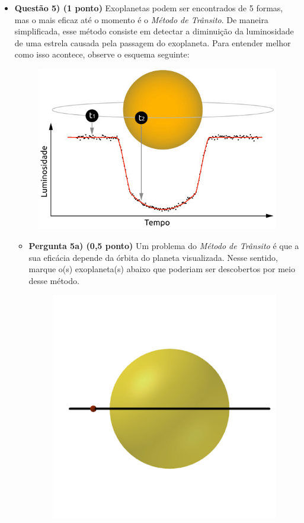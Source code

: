 \documentclass[a4paper, 12pt]{article}
\begin{document}
\begin{flushleft}
\begin{itemize}
		\item \textbf{Questão 5) (1 ponto)} Exoplanetas podem ser encontrados de 5 formas, mas o mais eficaz até o momento é o \textit{Método de Trânsito}. De maneira simplificada, esse método consiste em detectar a diminuição da luminosidade de uma estrela causada pela passagem do exoplaneta. Para entender melhor como isso acontece, observe o esquema seguinte:
			\begin{figure}[H]
				\centering
				\includegraphics[scale=0.7]{./img/5a.png}
			\end{figure}
			\begin{itemize}
				\item \textbf{Pergunta 5a) (0,5 ponto)} Um problema do \textit{Método de Trânsito} é que a sua eficácia depende da órbita do planeta visualizada. Nesse sentido, marque o(s) exoplaneta(s) abaixo que poderiam ser descobertos por meio desse método.
					\begin{multicols}{3}
						\begin{figure}[H]
							\centering
							\includegraphics[scale=0.2]{./img/5b1.png}

\end{figure}
\end{multicols}
\end{itemize}
\end{itemize}
\end{flushleft}
\end{document}
